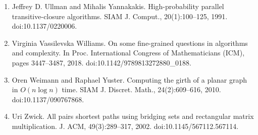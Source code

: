 \begin{enumerate}
\item[]  [44]  Jeffrey D. Ullman and Mihalis Yannakakis.  High-probability parallel transitive-closure algorithms.  SIAM J. Comput., 20(1):100–125, 1991.  doi:10.1137/0220006.  
\item[]  [45]  Virginia Vassilevska Williams.  On some fine-grained questions in algorithms and complexity.  In Proc. International Congress of Mathematicians (ICM), pages 3447–3487, 2018.  doi:10.1142/9789813272880\_0188.  
\item[]  [46]  Oren Weimann and Raphael Yuster.  Computing the girth of a planar graph in ${O}(n\log n)$ time.  SIAM J. Discret. Math., 24(2):609–616, 2010.  doi:10.1137/090767868.  
\item[]  [47]  Uri Zwick.  All pairs shortest paths using bridging sets and rectangular matrix multiplication.  J. ACM, 49(3):289–317, 2002.  doi:10.1145/567112.567114.  
\end{enumerate}
